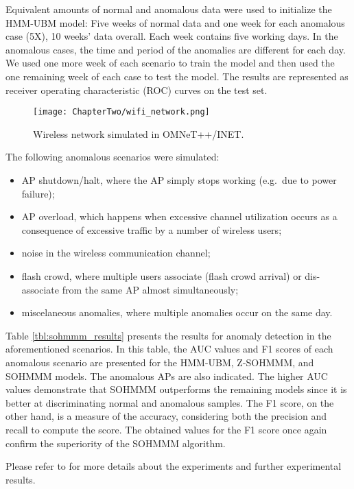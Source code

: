 Equivalent amounts of normal and anomalous data were used to initialize the HMM-UBM model: Five weeks of normal data and one week for each anomalous case (5X), 10 weeks' data overall. Each week contains five working days. In the anomalous cases, the time and period of the anomalies are different for each day. We used one more week of each scenario to train the model and then used the one remaining week of each case to test the model. The results are represented as receiver operating characteristic (ROC) curves on the test set.

\begin{figure}[h]
	\centering
	\texttt{[image: ChapterTwo/wifi\_network.png]}
	\caption{Wireless network simulated in OMNeT++/INET.}
	\label{fig:sohmmm_wifi_network}      
\end{figure}

The following anomalous scenarios were simulated:
\begin{itemize}
	\item AP shutdown/halt, where the AP simply stops working (e.g.\ due to power failure);
	\item AP overload, which happens when excessive channel utilization occurs as a consequence of excessive traffic by a number of wireless users;
	\item noise in the wireless communication channel;
	\item flash crowd, where multiple users associate (flash crowd arrival) or dis-associate from the same AP almost simultaneously;
	\item miscelaneous anomalies, where multiple anomalies occur on the same day.
\end{itemize}

Table \ref{tbl:sohmmm_results} presents the results for anomaly detection in the aforementioned scenarios. In this table, the AUC values and F1 scores of each anomalous scenario are presented for the HMM-UBM, Z-SOHMMM, and SOHMMM models. The anomalous APs are also indicated. The higher AUC values demonstrate that SOHMMM outperforms the remaining models since it is better at discriminating normal and anomalous samples. The F1 score, on the other hand, is a measure of the accuracy, considering both the precision and recall to compute the score. The obtained values for the F1 score once again confirm the superiority of the SOHMMM algorithm.

Please refer to \citet{SOHMMM} for more details about the experiments and further experimental results.

